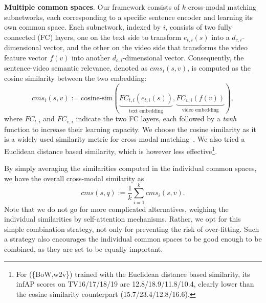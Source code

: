 \textbf{Multiple common spaces}. Our framework consists of $k$ cross-modal matching subnetworks, each corresponding to a specific sentence encoder and learning its own common space. Each subnetwork, indexed by $i$, consists of two fully connected (FC) layers, one on the text side to transform $e_{t,i}(s)$ into a $d_{c,i}$-dimensional vector, and the other on the video side that transforms the video feature vector $f(v)$ into another $d_{c,i}$-dimensional vector. Consequently, the sentence-video semantic relevance, denoted as $cms_i(s,v)$, is computed as the cosine similarity between the two embedding:
\begin{equation} \label{eq:cms_i}
cms_i(s,v) := \mbox{cosine-sim}(\underbrace{FC_{t,i}(e_{t,i}(s))}_{\mbox{text embedding}}, \underbrace{FC_{v,i}(f(v))}_{\mbox{video embedding}}), 
\end{equation}
where $FC_{t,i}$ and $FC_{v,i}$ indicate the two FC layers, each followed by a \textit{tanh} function to increase their learning capacity. We choose the cosine similarity as it is a widely used similarity metric for cross-modal matching~\cite{vsepp,liu-bmvc19,dong-cvpr19,miech-iccv19,sigir20-tce}. We also tried a Euclidean distance based similarity, which is however less effective\footnote{For \tea(\{BoW,w2v\}) trained with the Euclidean distance based similarity, its infAP scores on TV16/17/18/19 are 12.8/18.9/11.8/10.4, clearly lower than the cosine similarity counterpart (15.7/23.4/12.8/16.6).}. 

By simply averaging the similarities computed in the individual common spaces, we have the overall cross-modal similarity as 
\begin{equation} \label{eq:cms}
cms(s,q) := \frac{1}{k} \sum_{i=1}^k cms_i(s,v).
\end{equation}
Note that we do not go for more complicated alternatives, \eg weighing the individual similarities by self-attention mechanisms. 
Rather, we opt for this simple combination strategy, not only for preventing the risk of over-fitting. Such a strategy also encourages the individual common spaces to be good enough to be combined, as they are set to be equally important.

